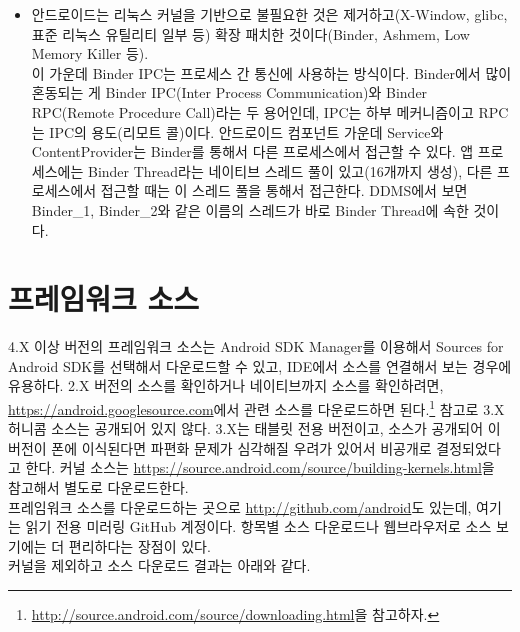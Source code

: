\begin{itemize}
\item 안드로이드는 리눅스 커널을 기반으로 불필요한 것은 제거하고(X-Window, glibc, 표준 리눅스 유틸리티 일부 등) 확장 패치한 것이다(Binder, Ashmem, Low Memory Killer 등).\\

이 가운데 Binder IPC는 프로세스 간 통신에 사용하는 방식이다. 
Binder에서 많이 혼동되는 게 Binder IPC(Inter Process Communication)와 Binder RPC(Remote Procedure Call)라는 두 용어인데, IPC는 하부 메커니즘이고 RPC는 IPC의 용도(리모트 콜)이다. 안드로이드 컴포넌트 가운데 Service와 ContentProvider는 Binder를 통해서 다른 프로세스에서 접근할 수 있다. 앱 프로세스에는 Binder Thread라는 네이티브 스레드 풀이 있고(16개까지 생성), 다른 프로세스에서 접근할 때는 이 스레드 풀을 통해서 접근한다.
DDMS에서 보면 Binder\_1, Binder\_2와 같은 이름의 스레드가 바로 Binder Thread에 속한 것이다. 

\end{itemize}
\section{프레임워크 소스}
4.X 이상 버전의 프레임워크 소스는 Android SDK Manager를 이용해서 Sources for Android SDK를 선택해서 다운로드할 수 있고, IDE에서 소스를 연결해서 보는 경우에 유용하다. 
2.X 버전의 소스를 확인하거나 네이티브까지 소스를 확인하려면, \url{https://android.googlesource.com}에서 관련 소스를 다운로드하면 된다.\footnote{\url{http://source.android.com/source/downloading.html}을 참고하자.} 참고로 3.X 허니콤 소스는 공개되어 있지 않다. 
3.X는 태블릿 전용 버전이고, 소스가 공개되어 이 버전이 폰에 이식된다면 파편화 문제가 심각해질 우려가 있어서 비공개로 결정되었다고 한다.
커널 소스는 \url{https://source.android.com/source/building-kernels.html}을 참고해서 별도로 다운로드한다.\\
 
프레임워크 소스를 다운로드하는 곳으로 \url{http://github.com/android}도 있는데, 여기는 읽기 전용 미러링 GitHub 계정이다. 항목별 소스 다운로드나 웹브라우저로 소스 보기에는 더 편리하다는 장점이 있다.\\

커널을 제외하고 소스 다운로드 결과는 아래와 같다.

